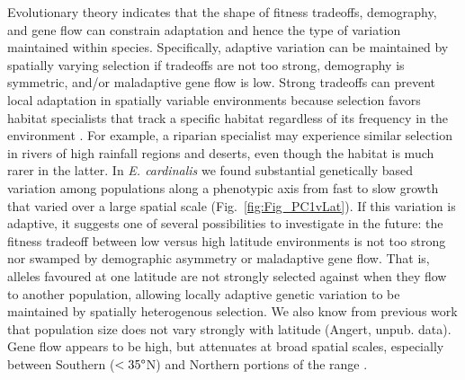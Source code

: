 \documentclass[11pt, oneside]{article}
\begin{document}
Evolutionary theory indicates that the shape of fitness tradeoffs, demography, and gene flow can constrain adaptation \citep{Levins_1968, Ronce_Kirkpatrick_2001, Lenormand_2002} and hence the type of variation maintained within species. Specifically, adaptive variation can be maintained by spatially varying selection if tradeoffs are not too strong, demography is symmetric, and/or maladaptive gene flow is low. Strong tradeoffs can prevent local adaptation in spatially variable environments because selection favors habitat specialists that track a specific habitat regardless of its frequency in the environment \citep{Levins_1968}. For example, a riparian specialist may experience similar selection in rivers of high rainfall regions and deserts, even though the habitat is much rarer in the latter. In \textit{E. cardinalis} we found substantial genetically based variation among populations along a phenotypic axis from fast to slow growth that varied over a large spatial scale (Fig.~\ref{fig:Fig_PC1vLat}). If this variation is adaptive, it suggests one of several possibilities to investigate in the future: the fitness tradeoff between low versus high latitude environments is not too strong nor swamped by demographic asymmetry or maladaptive gene flow. That is, alleles favoured at one latitude are not strongly selected against when they flow to another population, allowing locally adaptive genetic variation to be maintained by spatially heterogenous selection. We also know from previous work that population size does not vary strongly with latitude (Angert, unpub. data). Gene flow appears to be high, but attenuates at broad spatial scales, especially between Southern ($<35\degree$N) and Northern portions of the range \citep{Paul_etal_2016}.  
\end{document}

